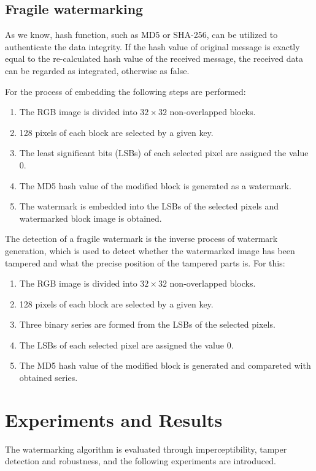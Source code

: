 \documentclass[runningheads]{llncs}
\begin{document}
\subsection{Fragile watermarking}
As we know, hash function, such as MD5 or SHA-256, can be utilized to authenticate the data integrity. If the hash value of original message is exactly equal to the re-calculated hash value of the received message, the received data can be regarded as integrated, otherwise as false.

For the process of embedding the following steps are performed:
\begin{enumerate}
	\item The RGB image is divided into $32\times 32$ non-overlapped blocks.
	\item 128 pixels of each block are selected by a given key.
	\item The least significant bits (LSBs) of each selected pixel are assigned the value 0.
	\item The MD5 hash value of the modified block is generated as a watermark.
	\item The watermark is embedded into the LSBs of the selected pixels and watermarked block image is obtained.  
\end{enumerate}    

The detection of a fragile watermark is the inverse process of watermark generation, which is used to detect whether the watermarked image has been tampered and what the precise position of the tampered parts is. For this:
\begin{enumerate}
	\item The RGB image is divided into $32\times 32$ non-overlapped blocks.
	\item 128 pixels of each block are selected by a given key.
	\item Three binary series are formed from the LSBs of the selected pixels.
	\item The LSBs of each selected pixel are assigned the value 0.
	\item The MD5 hash value of the modified block is generated and compareted with obtained series.
\end{enumerate}

\section{Experiments and Results}
The watermarking algorithm is evaluated through imperceptibility, tamper detection and robustness, and the following experiments are introduced.
 
\end{document}
